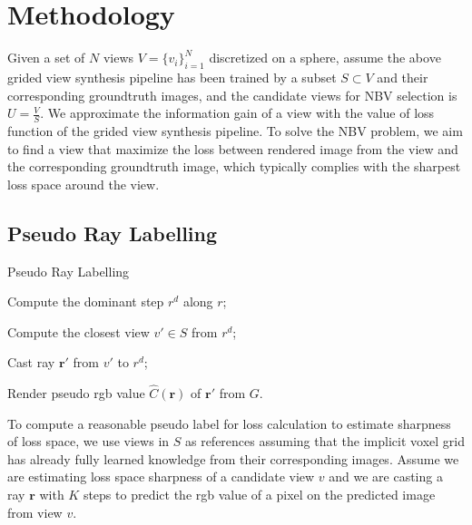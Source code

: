 \section{Methodology\label{methodology}}
Given a set of $N$ views $V=\{v_i\}_{i=1}^N$ discretized on a sphere, assume the above grided view synthesis pipeline has been trained by a subset $S\subset V$ and their corresponding groundtruth images, and the candidate views for NBV selection is $U=\frac{V}{S}$.
We approximate the information gain of a view with the value of loss function of the grided view synthesis pipeline.
To solve the NBV problem, we aim to find a view that maximize the loss between rendered image from the view and the corresponding groundtruth image, which typically complies with the sharpest loss space around the view.

\subsection{Pseudo Ray Labelling}

\begin{algorithm}[htb]
    \caption{Pseudo Ray Labelling}
    \label{alg:ray}
    \BlankLine
    
    Compute the dominant step $r^d$ along $r$;
    
    Compute the closest view $v'\in S$ from $r^d$;
    
    Cast ray $\bm{r}'$ from $v'$ to $r^d$;
    
    Render pseudo rgb value $\hat{C}(\bm{r})$ of $\bm{r}'$ from $G$.
\end{algorithm}
To compute a reasonable pseudo label for loss calculation to estimate sharpness of loss space, we use views in $S$ as references assuming that the implicit voxel grid has already fully learned knowledge from their corresponding images.
Assume we are estimating loss space sharpness of a candidate view $v$ and we are casting a ray $\bm{r}$ with $K$ steps to predict the rgb value of a pixel on the predicted image from view $v$.

